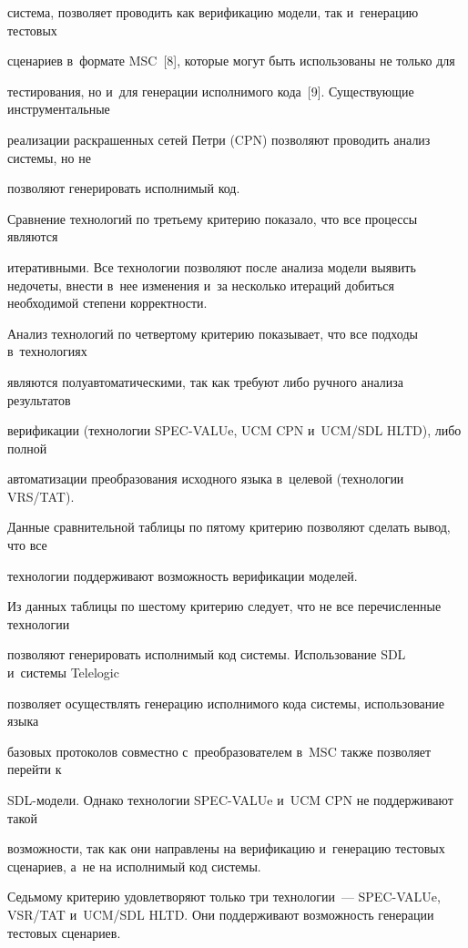 система, позволяет проводить как верификацию модели, так и~генерацию тестовых

сценариев в~формате MSC~[8], которые могут быть использованы не только для

тестирования, но и~для генерации исполнимого кода~[9]. Существующие инструментальные

реализации раскрашенных сетей Петри (CPN) позволяют проводить анализ системы, но не

позволяют генерировать исполнимый код.



  Сравнение технологий по третьему критерию показало, что все процессы являются

итеративными. Все технологии позволяют после анализа модели выявить недочеты, внести в~нее изменения и~за несколько итераций добиться необходимой степени корректности.



  Анализ технологий по четвертому критерию показывает, что все подходы в~технологиях

являются полуавтоматическими, так как требуют либо ручного анализа результатов

верификации (технологии SPEC-VALUe, UCM CPN и~UCM/SDL HLTD), либо полной

автоматизации преобразования исходного языка в~целевой (технологии VRS/TAT).



  Данные сравнительной таблицы по пятому критерию позволяют сделать вывод, что все

технологии поддерживают возможность верификации моделей.



  Из данных таблицы по шестому критерию следует, что не все перечисленные технологии

позволяют генерировать исполнимый код системы. Использование SDL и~системы Telelogic

позволяет осуществлять генерацию исполнимого кода системы, использование языка

базовых протоколов совместно с~преобразователем в~MSC также позволяет перейти к

  SDL-модели. Однако технологии SPEC-VALUe и~UCM CPN не поддерживают такой

возможности, так как они направлены на верификацию и~генерацию тестовых сценариев, а~не на исполнимый код системы.



  Седьмому критерию удовлетворяют только три технологии~--- SPEC-VALUe, VSR/TAT и~UCM/SDL HLTD. Они поддерживают возможность генерации тестовых сценариев.

